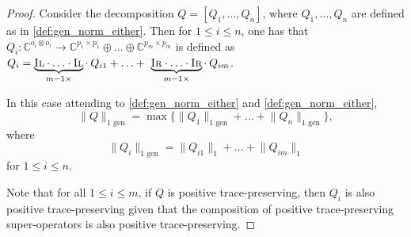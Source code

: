   \begin{proof}
    Consider the decomposition $Q = [Q_1, \ldots, Q_n]$, where $Q_1, \ldots, Q_n$ are defined as in \autoref{def:gen_norm_either}. Then for $ 1 \leq i \leq n$, one has that $Q_i: \mathbb{C}^{o_i \otimes o_i} \rightarrow  \mathbb{C}^{p_1 \times p_1} \oplus \ldots \oplus  \mathbb{C}^{p_m \times p_m}$ is defined as  $Q_i = \underbrace{\textsc{Il} \cdot \ldots \cdot \textsc{Il}}_{m-1 \times} \cdot \hspace{2pt} Q_{i1} + \ldots +  \underbrace{\textsc{Ir} \cdot \ldots \cdot \textsc{Ir}}_{m-1 \times} \cdot \hspace{2pt} Q_{im}$.
  
    In this case attending to \autoref{def:gen_norm_either} and \autoref{def:gen_norm_either}, 
    \begin{equation}
        \lVert Q \rVert_{1 \text{ gen}} = \max \{ \lVert Q_1 \rVert_{1  \text{ gen}} + \ldots + \lVert Q_n \rVert_{1  \text{ gen}} \},
    \end{equation}
      where
      \begin{equation} \label{eq:qi_norm}
          \lVert Q_i \rVert_{1  \text{ gen}} = \lVert Q_{i1} \rVert_{1} + \ldots + \lVert Q_{im} \rVert_{1}
      \end{equation}
  for $ 1 \leq i \leq n$.
  
  Note that for all $1 \leq i \leq m$, if $Q$ is positive trace-preserving, then $Q_i$ is also positive trace-preserving given that the composition of positive trace-preserving super-operators is also positive trace-preserving.
  

\end{proof}
